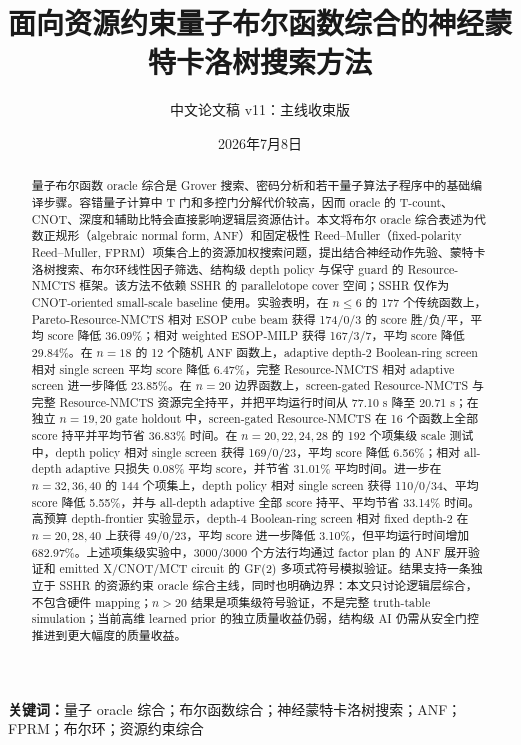 \documentclass[UTF8,fontset=macnew,11pt]{ctexart}
\title{面向资源约束量子布尔函数综合的神经蒙特卡洛树搜索方法}
\author{中文论文稿 v11：主线收束版}
\date{2026年7月8日}
\newcommand{\method}{Resource-NMCTS}
\newcommand{\pareto}{Pareto-Resource-NMCTS}
\newcommand{\screen}{Boolean-ring screen}
\newcommand{\anf}{\ensuremath{\mathrm{ANF}}}
\newcommand{\fprm}{\ensuremath{\mathrm{FPRM}}}
\newcommand{\ttable}{truth-table}
\begin{document}
\pagestyle{plain}
\maketitle

\begin{abstract}
量子布尔函数 oracle 综合是 Grover 搜索、密码分析和若干量子算法子程序中的基础编译步骤。容错量子计算中 T 门和多控门分解代价较高，因而 oracle 的 T-count、CNOT、深度和辅助比特会直接影响逻辑层资源估计。本文将布尔 oracle 综合表述为代数正规形（algebraic normal form, \anf{}）和固定极性 Reed--Muller（fixed-polarity Reed--Muller, \fprm{}）项集合上的资源加权搜索问题，提出结合神经动作先验、蒙特卡洛树搜索、布尔环线性因子筛选、结构级 depth policy 与保守 guard 的 \method{} 框架。该方法不依赖 SSHR 的 parallelotope cover 空间；SSHR 仅作为 CNOT-oriented small-scale baseline 使用。实验表明，在 $n\leq6$ 的 177 个传统函数上，\pareto{} 相对 ESOP cube beam 获得 174/0/3 的 score 胜/负/平，平均 score 降低 36.09\%；相对 weighted ESOP-MILP 获得 167/3/7，平均 score 降低 29.84\%。在 $n=18$ 的 12 个随机 \anf{} 函数上，adaptive depth-2 \screen{} 相对 single screen 平均 score 降低 6.47\%，完整 \method{} 相对 adaptive screen 进一步降低 23.85\%。在 $n=20$ 边界函数上，screen-gated \method{} 与完整 \method{} 资源完全持平，并把平均运行时间从 77.10 s 降至 20.71 s；在独立 $n=19,20$ gate holdout 中，screen-gated \method{} 在 16 个函数上全部 score 持平并平均节省 36.83\% 时间。在 $n=20,22,24,28$ 的 192 个项集级 scale 测试中，depth policy 相对 single screen 获得 169/0/23，平均 score 降低 6.56\%；相对 all-depth adaptive 只损失 0.08\% 平均 score，并节省 31.01\% 平均时间。进一步在 $n=32,36,40$ 的 144 个项集上，depth policy 相对 single screen 获得 110/0/34、平均 score 降低 5.55\%，并与 all-depth adaptive 全部 score 持平、平均节省 33.14\% 时间。高预算 depth-frontier 实验显示，depth-4 \screen{} 相对 fixed depth-2 在 $n=20,28,40$ 上获得 49/0/23，平均 score 进一步降低 3.10\%，但平均运行时间增加 682.97\%。上述项集级实验中，3000/3000 个方法行均通过 factor plan 的 \anf{} 展开验证和 emitted X/CNOT/MCT circuit 的 GF(2) 多项式符号模拟验证。结果支持一条独立于 SSHR 的资源约束 oracle 综合主线，同时也明确边界：本文只讨论逻辑层综合，不包含硬件 mapping；$n>20$ 结果是项集级符号验证，不是完整 \ttable{} simulation；当前高维 learned prior 的独立质量收益仍弱，结构级 AI 仍需从安全门控推进到更大幅度的质量收益。
\end{abstract}

\noindent\textbf{关键词：}量子 oracle 综合；布尔函数综合；神经蒙特卡洛树搜索；ANF；FPRM；布尔环；资源约束综合
\end{document}
